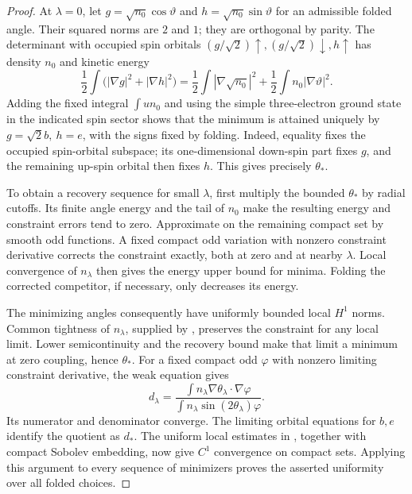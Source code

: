 \begin{proof}
At \(\lambda=0\), let
\(g=\sqrt{n_0}\cos\vartheta\) and
\(h=\sqrt{n_0}\sin\vartheta\) for an admissible folded angle.
Their squared norms are \(2\) and \(1\); they are orthogonal by
parity.  The determinant with occupied spin orbitals
\((g/\sqrt2)\uparrow,(g/\sqrt2)\downarrow,h\uparrow\)
has density \(n_0\) and kinetic energy
\[
 \frac12\int\bigl(|\nabla g|^2+|\nabla h|^2\bigr)
 =\frac12\int|\nabla\sqrt{n_0}|^2
       +\frac12\int n_0|\nabla\vartheta|^2.
\]
Adding the fixed integral \(\int u n_0\) and using the simple
three-electron ground state in the indicated spin sector shows that
the minimum is attained uniquely by
\(g=\sqrt2 b,\ h=e\), with the signs fixed by folding.
Indeed, equality fixes the occupied spin-orbital subspace; its
one-dimensional down-spin part fixes \(g\), and the remaining
up-spin orbital then fixes \(h\).
This gives precisely \(\theta_*\).

To obtain a recovery sequence for small \(\lambda\), first multiply
the bounded \(\theta_*\) by radial cutoffs.  Its finite angle energy
and the tail of \(n_0\) make the resulting energy and constraint
errors tend to zero.  Approximate on the remaining compact set by
smooth odd functions.  A fixed compact odd variation with nonzero
constraint derivative corrects the constraint exactly, both at zero
and at nearby \(\lambda\).  Local convergence of \(n_\lambda\)
then gives the energy upper bound for minima.  Folding the corrected
competitor, if necessary, only decreases its energy.

The minimizing angles consequently have uniformly bounded local
\(H^1\) norms.  Common tightness of \(n_\lambda\), supplied by
, preserves the constraint for any local
limit.  Lower semicontinuity and the recovery bound make that limit
a minimum at zero coupling, hence \(\theta_*\).
For a fixed compact odd \(\varphi\) with nonzero limiting constraint
derivative, the weak equation gives
\[
 d_\lambda
 =\frac{\int n_\lambda\nabla\theta_\lambda\cdot\nabla\varphi}
        {\int n_\lambda\sin(2\theta_\lambda)\varphi}.
\]
Its numerator and denominator converge.  The limiting orbital
equations for \(b,e\) identify the quotient as \(d_*\).
The uniform local estimates in
, together with compact Sobolev embedding,
now give \(C^1\) convergence on compact sets.
Applying this argument to every sequence of minimizers proves the
asserted uniformity over all folded choices.
\end{proof}

